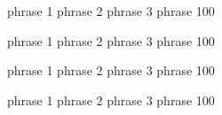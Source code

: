 phrase 1       phrase 2 phrase 3             phrase 100

phrase 1       phrase 2 phrase 3             phrase 100

phrase 1       phrase 2 phrase 3             phrase 100

phrase 1       phrase 2 phrase 3             phrase 100

